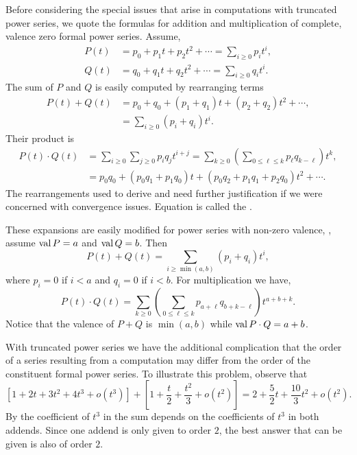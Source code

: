 Before considering the special issues that arise in computations with
truncated power series, we quote the formulas for addition and
multiplication of complete, valence zero formal power series.
Assume,
\[
\begin{aligned}
P(t) & \displaystyle= p_0 + p_1 t + p_2 t^2 + \cdots = \sum_{i\ge 0} p_i t^i, \\
Q(t) & \displaystyle= q_0 + q_1 t + q_2 t^2 + \cdots = \sum_{i\ge 0}
q_i t^i.
\end{aligned}
\]
The sum of $P$ and $Q$ is easily computed by rearranging terms
\begin{equation}\label{FPS:Addition:Eq}
\begin{aligned}
P(t) + Q(t) & = p_0 + q_0 + (p_1 + q_1) t + (p_2 + q_2) t^2 + \cdots , \\
 & \displaystyle = \sum_{i\ge0} (p_i + q_i)t^i.
\end{aligned}
\end{equation}
Their product is
\begin{equation} \label{FPS:Multiplication:Eq}
\begin{aligned}
P(t) \cdot Q(t) & = \sum_{i\ge 0} \sum_{j\ge 0} p_i q_j t^{i+j}
 = \sum_{k\ge 0} \left(\sum_{0 \le \ell \le k} p_{\ell}
q_{k-\ell}\right)t^k,\\
& = p_0 q_0 + (p_0 q_1 + p_1 q_0)t + (p_0 q_2 + p_1 q_1 + p_2 q_0) t^2
+ \cdots.
\end{aligned}
\end{equation}
The rearrangements used to derive  and
 need further justification if we
were concerned with convergence issues.  Equation
 is called the .

These expansions are easily modified for power series with non-zero
valence, \eg, assume $\mathop{\rm val}\nolimits P = a$ and $\mathop{\rm val}\nolimits Q = b$.  Then
\[
P(t) + Q(t) = \sum_{i\ge \min(a,b)}(p_i + q_i)t^i,
\]
where $p_i = 0$ if $i < a$ and $q_i = 0$ if $i < b$.  For
multiplication we have,
\[
P(t) \cdot Q(t) = \sum_{k\ge 0} \left(\sum_{0 \le \ell \le k}
p_{a+\ell} q_{b+k-\ell}\right) t^{a+b+k}.
\]
Notice that the valence of $P+Q$ is $\min (a, b)$ while $\mathop{\rm val}\nolimits P\cdot Q
= a+b$.

With truncated power series we have the additional complication that
the order of a series resulting from a computation may differ
from the order of the constituent formal power series.   To illustrate
this problem, observe that
\[
\left[1 + 2 t + 3t^2 + 4 t^3 + o(t^3) \right] +
\left[ 1 + \frac{t}{2} + \frac {t^2}{3} + o(t^2) \right]
=
2 + \frac{5}{2} t + \frac{10}{3} t^2 + o(t^2).
\]
By  the coefficient of $t^3$ in the sum depends
on the coefficients of $t^3$ in both addends.  Since one addend is
only given to order $2$, the best answer that can be given is also of
order $2$.

